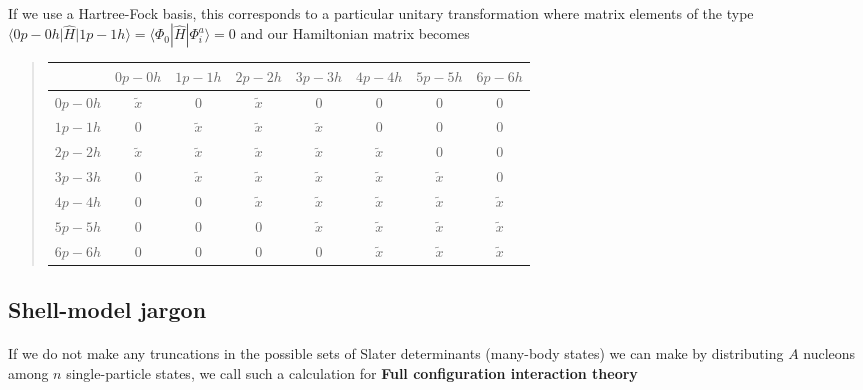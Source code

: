 \documentclass[%
oneside,                 %
final,                   %
10pt]{article}
\begin{document}
\paragraph{}
If we use a Hartree-Fock basis, this corresponds to a particular unitary transformation where matrix elements of the type $\langle 0p-0h \vert \hat{H} \vert 1p-1h\rangle =\langle \Phi_0 | \hat{H}|\Phi_{i}^{a}\rangle=0$ and our Hamiltonian matrix becomes 


\begin{quote}
\begin{tabular}{cccccccc}
\hline
\multicolumn{1}{c}{  } & \multicolumn{1}{c}{ $0p-0h$ } & \multicolumn{1}{c}{ $1p-1h$ } & \multicolumn{1}{c}{ $2p-2h$ } & \multicolumn{1}{c}{ $3p-3h$ } & \multicolumn{1}{c}{ $4p-4h$ } & \multicolumn{1}{c}{ $5p-5h$ } & \multicolumn{1}{c}{ $6p-6h$ } \\
\hline
$0p-0h$ & $\tilde{x}$ & 0           & $\tilde{x}$ & 0           & 0           & 0           & 0           \\
$1p-1h$ & 0           & $\tilde{x}$ & $\tilde{x}$ & $\tilde{x}$ & 0           & 0           & 0           \\
$2p-2h$ & $\tilde{x}$ & $\tilde{x}$ & $\tilde{x}$ & $\tilde{x}$ & $\tilde{x}$ & 0           & 0           \\
$3p-3h$ & 0           & $\tilde{x}$ & $\tilde{x}$ & $\tilde{x}$ & $\tilde{x}$ & $\tilde{x}$ & 0           \\
$4p-4h$ & 0           & 0           & $\tilde{x}$ & $\tilde{x}$ & $\tilde{x}$ & $\tilde{x}$ & $\tilde{x}$ \\
$5p-5h$ & 0           & 0           & 0           & $\tilde{x}$ & $\tilde{x}$ & $\tilde{x}$ & $\tilde{x}$ \\
$6p-6h$ & 0           & 0           & 0           & 0           & $\tilde{x}$ & $\tilde{x}$ & $\tilde{x}$ \\
\hline
\end{tabular}
\end{quote}

\noindent



\subsection*{Shell-model jargon}

\paragraph{}
If we do not make any truncations in the possible sets of Slater determinants (many-body states) we can make by distributing $A$ nucleons among $n$ single-particle states, we call such a calculation for \textbf{Full configuration interaction theory}
\end{document}
